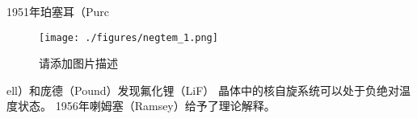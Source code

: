 
1951年珀塞耳（Purc\begin{figure}[ht]
\centering
\texttt{[image: ./figures/negtem\_1.png]}
\caption{请添加图片描述} \label{negtem_fig1}
\end{figure}
ell）和庞德（Pound）发现氟化锂（LiF） 晶体中的核自旋系统可以处于负绝对温度状态。
1956年喇姆塞（Ramsey）给予了理论解释。
